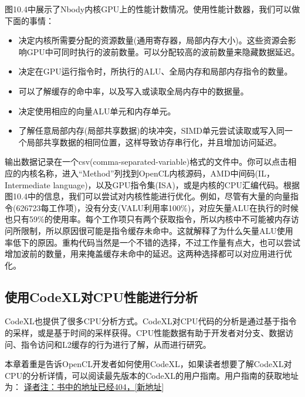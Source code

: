 
图10.4中展示了Nbody内核GPU上的性能计数情况。使用性能计数器，我们可以做下面的事情：

\begin{itemize}
\item 决定内核所需要分配的资源数量(通用寄存器，局部内存大小)。这些资源会影响GPU中可同时执行的波前数量。可以分配较高的波前数量来隐藏数据延迟。
\item 决定在GPU运行指令时，所执行的ALU、全局内存和局部内存指令的数量。
\item 可以了解缓存的命中率，以及写入或读取全局内存中的数据量。
\item 决定使用相应的向量ALU单元和内存单元。
\item 了解任意局部内存(局部共享数据)的块冲突，SIMD单元尝试读取或写入同一个局部共享数据的相同位置，这样导致访存串行化，并且增加访问延迟。
\end{itemize}

输出数据记录在一个csv(comma-separated-variable)格式的文件中。你可以点击相应的内核名称，进入“Method”列找到OpenCL内核源码，AMD中间码(IL，Intermediate language)，以及GPU指令集(ISA)，或是内核的CPU汇编代码。根据图10.4中的信息，我们可以尝试对内核性能进行优化。例如，尽管有大量的向量指令(626723每工作项)，没有分支(VALU利用率100\%)，对应矢量ALU在执行的时候也只有59\%的使用率。每个工作项只有两个获取指令，所以内核中不可能被内存访问所限制，所以原因很可能是指令缓存未命中。这就解释了为什么矢量ALU使用率低下的原因。重构代码当然是一个不错的选择，不过工作量有点大，也可以尝试增加波前的数量，用来掩盖缓存未命中的延迟。这两种选择都可以对应用进行优化。

\subsection{使用CodeXL对CPU性能进行分析}

CodeXL也提供了很多CPU分析方式。CodeXL对CPU代码的分析是通过基于指令的采样，或是基于时间的采样获得。CPU性能数据有助于开发者对分支、数据访问、指令访问和L2缓存的行为进行了解，从而进行研究。

本章着重是告诉OpenCL开发者如何使用CodeXL，如果读者想要了解CodeXL对CPU的分析详情，可以阅读最先版本的CodeXL的用户指南。用户指南的获取地址为： \href{http://gpuopen.com/compute-product/codexl/?webSyncID=dcc7dd2d-c047-1d25-0893-e75291622902\&sessionGUID=9a4a8d26-e132-c584-67b8-e88956971a45}{译者注：书中的地址已经404，[新地址}]



